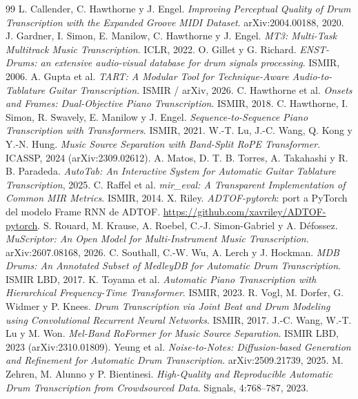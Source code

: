 \documentclass[11pt,a4paper]{article}
\begin{document}
\begin{thebibliography}{99}\small\sloppy
{} L. Callender, C. Hawthorne y J. Engel. \emph{Improving Perceptual Quality of Drum Transcription with the Expanded Groove MIDI Dataset}. arXiv:2004.00188, 2020.
 J. Gardner, I. Simon, E. Manilow, C. Hawthorne y J. Engel. \emph{MT3: Multi-Task Multitrack Music Transcription}. ICLR, 2022.
 O. Gillet y G. Richard. \emph{ENST-Drums: an extensive audio-visual database for drum signals processing}. ISMIR, 2006.
 A. Gupta et al. \emph{TART: A Modular Tool for Technique-Aware Audio-to-Tablature Guitar Transcription}. ISMIR / arXiv, 2026.
 C. Hawthorne et al. \emph{Onsets and Frames: Dual-Objective Piano Transcription}. ISMIR, 2018.
 C. Hawthorne, I. Simon, R. Swavely, E. Manilow y J. Engel. \emph{Sequence-to-Sequence Piano Transcription with Transformers}. ISMIR, 2021.
 W.-T. Lu, J.-C. Wang, Q. Kong y Y.-N. Hung. \emph{Music Source Separation with Band-Split RoPE Transformer}. ICASSP, 2024 (arXiv:2309.02612).
 A. Matos, D. T. B. Torres, A. Takahashi y R. B. Paradeda. \emph{AutoTab: An Interactive System for Automatic Guitar Tablature Transcription}, 2025.
 C. Raffel et al. \emph{mir\_eval: A Transparent Implementation of Common MIR Metrics}. ISMIR, 2014.
 X. Riley. \emph{ADTOF-pytorch}: port a PyTorch del modelo Frame RNN de ADTOF. \url{https://github.com/xavriley/ADTOF-pytorch}.
 S. Rouard, M. Krause, A. Roebel, C.-J. Simon-Gabriel y A. Défossez. \emph{MuScriptor: An Open Model for Multi-Instrument Music Transcription}. arXiv:2607.08168, 2026.
 C. Southall, C.-W. Wu, A. Lerch y J. Hockman. \emph{MDB Drums: An Annotated Subset of MedleyDB for Automatic Drum Transcription}. ISMIR LBD, 2017.
 K. Toyama et al. \emph{Automatic Piano Transcription with Hierarchical Frequency-Time Transformer}. ISMIR, 2023.
 R. Vogl, M. Dorfer, G. Widmer y P. Knees. \emph{Drum Transcription via Joint Beat and Drum Modeling using Convolutional Recurrent Neural Networks}. ISMIR, 2017.
 J.-C. Wang, W.-T. Lu y M. Won. \emph{Mel-Band RoFormer for Music Source Separation}. ISMIR LBD, 2023 (arXiv:2310.01809).
 Yeung et al. \emph{Noise-to-Notes: Diffusion-based Generation and Refinement for Automatic Drum Transcription}. arXiv:2509.21739, 2025.
 M. Zehren, M. Alunno y P. Bientinesi. \emph{High-Quality and Reproducible Automatic Drum Transcription from Crowdsourced Data}. Signals, 4:768--787, 2023.
\end{thebibliography}
\end{document}
